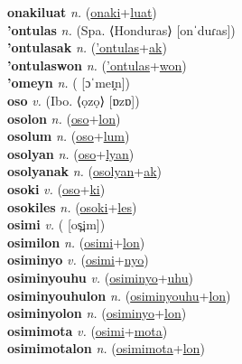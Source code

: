 \textbf{onakiluat} \textit{n.} (\hyperref[onaki]{onaki}+\hyperref[luat]{luat})
 \label{onakiluat} \\
\textbf{'ontulas} \textit{n.} (Spa. ⟨Honduras⟩ [onˈduɾas])
 \label{'ontulas} \\
\textbf{'ontulasak} \textit{n.} (\hyperref['ontulas]{'ontulas}+\hyperref[ak]{ak})
 \label{'ontulasak} \\
\textbf{'ontulaswon} \textit{n.} (\hyperref['ontulas]{'ontulas}+\hyperref[won]{won})
 \label{'ontulaswon} \\
\textbf{'omeyn} \textit{n.} ( [ɔˈmeɪ̯n])
 \label{'omeyn} \\
\textbf{oso} \textit{v.} (Ibo. ⟨ọzọ⟩ [ɒzɒ])
 \label{oso} \\
\textbf{osolon} \textit{n.} (\hyperref[oso]{oso}+\hyperref[lon]{lon})
 \label{osolon} \\
\textbf{osolum} \textit{n.} (\hyperref[oso]{oso}+\hyperref[lum]{lum})
 \label{osolum} \\
\textbf{osolyan} \textit{n.} (\hyperref[oso]{oso}+\hyperref[lyan]{lyan})
 \label{osolyan} \\
\textbf{osolyanak} \textit{n.} (\hyperref[osolyan]{osolyan}+\hyperref[ak]{ak})
 \label{osolyanak} \\
\textbf{osoki} \textit{v.} (\hyperref[oso]{oso}+\hyperref[ki]{ki})
 \label{osoki} \\
\textbf{osokiles} \textit{n.} (\hyperref[osoki]{osoki}+\hyperref[les]{les})
 \label{osokiles} \\
\textbf{osimi} \textit{v.} ( [os̪im])
 \label{osimi} \\
\textbf{osimilon} \textit{n.} (\hyperref[osimi]{osimi}+\hyperref[lon]{lon})
 \label{osimilon} \\
\textbf{osiminyo} \textit{v.} (\hyperref[osimi]{osimi}+\hyperref[nyo]{nyo})
 \label{osiminyo} \\
\textbf{osiminyouhu} \textit{v.} (\hyperref[osiminyo]{osiminyo}+\hyperref[uhu]{uhu})
 \label{osiminyouhu} \\
\textbf{osiminyouhulon} \textit{n.} (\hyperref[osiminyouhu]{osiminyouhu}+\hyperref[lon]{lon})
 \label{osiminyouhulon} \\
\textbf{osiminyolon} \textit{n.} (\hyperref[osiminyo]{osiminyo}+\hyperref[lon]{lon})
 \label{osiminyolon} \\
\textbf{osimimota} \textit{v.} (\hyperref[osimi]{osimi}+\hyperref[mota]{mota})
 \label{osimimota} \\
\textbf{osimimotalon} \textit{n.} (\hyperref[osimimota]{osimimota}+\hyperref[lon]{lon})

